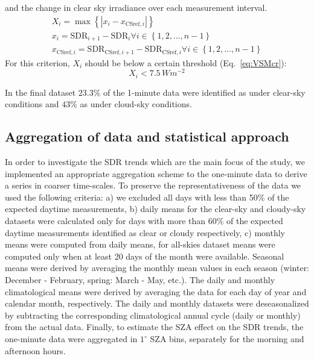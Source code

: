 \documentclass[applsci,article,submit,moreauthors,pdftex]{Definitions/mdpi}
\begin{document}
\begin{enumerate}
  and the change in clear sky irradiance over each measurement interval.
  \begin{gather}
    X_i = \max{\left \{ \left | x_i - x_{\text{CSref},i} \right | \right \}} \label{eq:VSM3} \\
    x_i = \text{SDR}_{i+1} - \text{SDR}_{i} \forall i \in \left \{ 1, 2, \ldots, n-1 \right \} \label{eq:VSM1} \\
    x_{\text{CSref},i} = \text{SDR}_{\text{CSref},i+1} - \text{SDR}_{\text{CSref},i} \forall i \in \left \{ 1, 2, \ldots, n-1 \right \} \label{eq:VSM2}
  \end{gather} For this criterion, \(X_i\) should be below a certain
  threshold (Eq.~\ref{eq:VSMcr}): \begin{equation}
    X_i < 7.5\,Wm^{-2} \label{eq:VSMcr}
  \end{equation}
\end{enumerate}

In the final dataset \(23.3\%\) of the 1-minute data were identified as
under clear-sky conditions and \(43\%\) as under cloud-sky conditions.

\hypertarget{aggregationstatistical}{%
\subsection{Aggregation of data and statistical
approach}\label{aggregationstatistical}}

In order to investigate the SDR trends which are the main focus of the
study, we implemented an appropriate aggregation scheme to the
one-minute data to derive a series in coarser time-scales. To preserve
the representativeness of the data we used the following criteria: a) we
excluded all days with less than 50\% of the expected daytime
measurements, b) daily means for the clear-sky and cloudy-sky datasets
were calculated only for days with more than 60\% of the expected
daytime measurements identified as clear or cloudy respectively, c)
monthly means were computed from daily means, for all-skies dataset
means were computed only when at least 20 days of the month were
available. Seasonal means were derived by averaging the monthly mean
values in each season (winter: December - February, spring: March - May,
etc.). The daily and monthly climatological means were derived by
averaging the data for each day of year and calendar month,
respectively. The daily and monthly datasets were deseasonalized by
subtracting the corresponding climatological annual cycle (daily or
monthly) from the actual data. Finally, to estimate the SZA effect on
the SDR trends, the one-minute data were aggregated in \(1^{\circ}\) SZA
bins, separately for the morning and afternoon hours.
\end{document}
